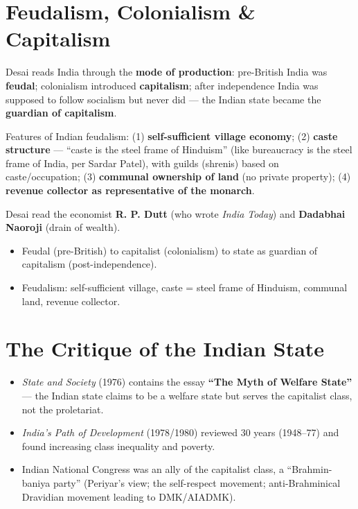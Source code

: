\section{Feudalism, Colonialism \& Capitalism}

Desai reads India through the \textbf{mode of production}: pre-British India was \textbf{feudal}; colonialism introduced \textbf{capitalism}; after independence India was supposed to follow socialism but never did --- the Indian state became the \textbf{guardian of capitalism}.

\begin{KeyConcept}
Features of Indian feudalism: (1) \textbf{self-sufficient village economy}; (2) \textbf{caste structure} --- ``caste is the steel frame of Hinduism'' (like bureaucracy is the steel frame of India, per Sardar Patel), with guilds (shrenis) based on caste/occupation; (3) \textbf{communal ownership of land} (no private property); (4) \textbf{revenue collector as representative of the monarch}.
\end{KeyConcept}

Desai read the economist \textbf{R. P. Dutt} (who wrote \emph{India Today}) and \textbf{Dadabhai Naoroji} (drain of wealth).

\begin{QuickRevision}
\begin{itemize}
\item Feudal (pre-British) to capitalist (colonialism) to state as guardian of capitalism (post-independence).
\item Feudalism: self-sufficient village, caste = steel frame of Hinduism, communal land, revenue collector.
\end{itemize}
\end{QuickRevision}

\section{The Critique of the Indian State}

\begin{itemize}
\item \emph{State and Society} (1976) contains the essay \textbf{``The Myth of Welfare State''} --- the Indian state claims to be a welfare state but serves the capitalist class, not the proletariat.
\item \emph{India's Path of Development} (1978/1980) reviewed 30 years (1948--77) and found increasing class inequality and poverty.
\item Indian National Congress was an ally of the capitalist class, a ``Brahmin-baniya party'' (Periyar's view; the self-respect movement; anti-Brahminical Dravidian movement leading to DMK/AIADMK).
\end{itemize}

